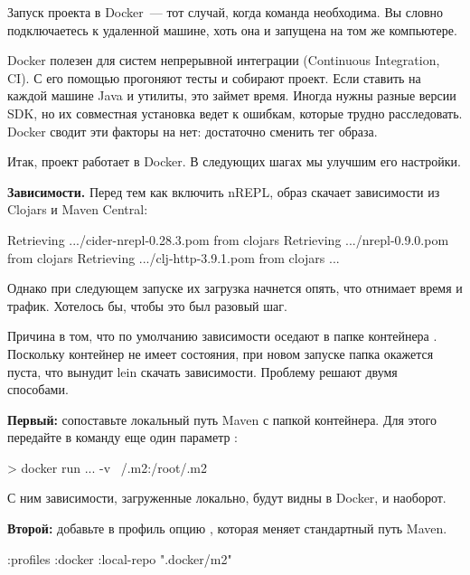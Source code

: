 Запуск проекта в Docker~--- тот случай, когда команда  необходима. Вы словно подключаетесь к удаленной машине, хоть она и запущена на том же компьютере.

Docker полезен для систем непрерывной интеграции (Continuous Integration, CI). С его помощью прогоняют тесты и собирают проект. Если ставить на каждой машине Java и утилиты, это займет время. Иногда нужны разные версии SDK, но их совместная установка ведет к ошибкам, которые трудно расследовать. Docker сводит эти факторы на нет: достаточно сменить тег образа.

Итак, проект работает в Docker. В следующих шагах мы улучшим его настройки.

\textbf{Зависимости.} Перед тем как включить nREPL, образ скачает зависимости из Clojars и Maven Central:

\begin{english}
  \begin{text}
Retrieving .../cider-nrepl-0.28.3.pom from clojars
Retrieving .../nrepl-0.9.0.pom from clojars
Retrieving .../clj-http-3.9.1.pom from clojars
...
  \end{text}
\end{english}

Однако при следующем запуске их загрузка начнется опять, что отнимает время и трафик. Хотелось бы, чтобы это был разовый шаг.

Причина в том, что по умолчанию зависимости оседают в папке контейнера . Поскольку контейнер не имеет состояния, при новом запуске папка окажется пуста, что вынудит lein скачать зависимости. Проблему решают двумя способами.

\textbf{Первый:} сопоставьте локальный путь Maven с папкой контейнера. Для этого передайте в команду  еще один параметр :

\begin{english}
  \begin{bash}
> docker run ... -v ~/.m2:/root/.m2
  \end{bash}
\end{english}

С ним зависимости, загруженные локально, будут видны в Docker, и наоборот.

\textbf{Второй:} добавьте в профиль  опцию , которая меняет стандартный путь Maven.

\begin{english}
  \begin{clojure}
{:profiles
 {:docker {:local-repo ".docker/m2"}}}
  \end{clojure}
\end{english}

